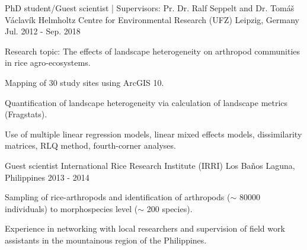 

\begin{cventries}

  \cventry
    {PhD student/Guest scientist | Supervisors: Pr. Dr. Ralf Seppelt and Dr. Tomáš Václavík} %
    {Helmholtz Centre for Environmental Research (UFZ)} %
    {Leipzig, Germany} %
    {Jul. 2012 - Sep. 2018} %
    {
      \begin{cvitems} %
        \item {Research topic: The effects of landscape heterogeneity
on arthropod communities in rice agro-ecosystems.}
        \item {Mapping of 30 study sites using ArcGIS 10.}
         \item {Quantification of landscape heterogeneity via calculation of landscape metrics (Fragstats).}
        \item {Use of multiple linear regression models, linear mixed effects models,  dissimilarity matrices, RLQ method, fourth-corner analyses.}
      \end{cvitems}
    }

  \cventry
    {Guest scientist} %
    {International Rice Research Institute (IRRI)} %
    {Los Baños Laguna, Philippines} %
    {2013 - 2014} %
    {
      \begin{cvitems} %
        \item {Sampling of rice-arthropods and identification of arthropods ($\sim$ 80000 individuals) to morphospecies level ($\sim$ 200 species).}
        \item {Experience in networking with local researchers and supervision of field work assistants in the mountainous region of the Philippines.}
      \end{cvitems}
    }


\end{cventries}
